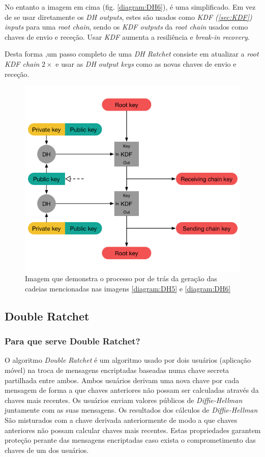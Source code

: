 No entanto a imagem em cima (fig. \ref{diagram:DH6}), é uma simplificado. Em vez de se usar diretamente os \textit{DH outputs}, estes são usados como \textit{KDF (\ref{sec:KDF}) inputs} para uma \textit{root chain}, sendo os \textit{KDF outputs} da \textit{root chain} usados como chaves de envio e receção. Usar \textit{KDF} aumenta a resiliência e \textit{break-in recovery}.

Desta forma ,um passo completo de uma \textit{DH Ratchet} consiste em atualizar a \textit{root KDF chain} $2\times$ e usar as \textit{DH output keys} como as novas chaves de envio e receção.

\begin{figure}[H]
\begin{center}
\includegraphics[width=12cm]{img/DH7.png}
\caption{Imagem que demonstra o processo por de trás da geração das cadeias mencionadas nas imagens \ref{diagram:DH5} e \ref{diagram:DH6}}
\label{diagram:DH7}
\centering
\end{center}
\end{figure}

\subsection{Double Ratchet}\label{sec:DoubleRatchet}
\subsubsection{Para que serve Double Ratchet?}
O algoritmo \emph{Double Ratchet} é um algoritmo usado por dois usuários (aplicação móvel) na troca de mensagens encriptadas baseadas numa chave secreta partilhada entre ambos. Ambos usuários derivam uma nova chave por cada mensagem de forma a que chaves anteriores não possam ser calculadas através da chaves mais recentes. Os usuários enviam valores públicos de \emph{Diffie-Hellman} juntamente com as suas mensagens. Os resultados dos cálculos de \emph{Diffie-Hellman} São misturados com a chave derivada anteriormente de modo a que chaves anteriores não possam calcular chaves mais recentes. Estas propriedades garantem proteção perante das mensagens encriptadas caso exista o comprometimento das chaves de um dos usuários.

